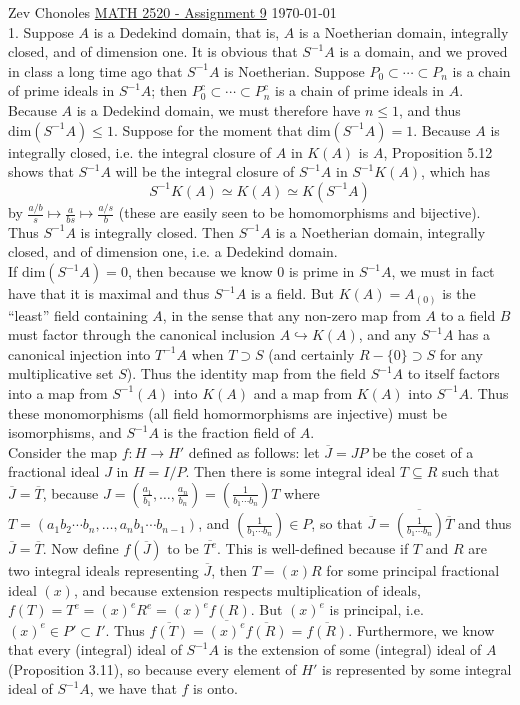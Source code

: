 \documentclass[11pt]{article}
\begin{document}
Zev Chonoles \hfill 
\underline{MATH 2520 - Assignment 9} \hfill \today\\

\num{1.} Suppose $A$ is a Dedekind domain, that is, $A$ is a Noetherian
domain, integrally closed, and of dimension one. It is obvious that
$S^{-1}A$ is a domain, and we proved in class a long time ago that $S^{-1}A$
is Noetherian. Suppose $P_0\subset\cdots\subset P_n$ is a chain of prime
ideals in $S^{-1}A$; then $P_0^c\subset\cdots\subset P_n^c$ is a chain of
prime ideals in $A$. Because $A$ is a Dedekind domain, we must therefore have
$n\leq 1$, and thus $\text{dim}(S^{-1}A)\leq 1$. Suppose for the moment that
$\text{dim}(S^{-1}A)=1$. Because $A$ is integrally closed, i.e. the integral
closure of $A$ in $K(A)$ is $A$, Proposition 5.12 shows that $S^{-1}A$
will be the integral closure of $S^{-1}A$ in $S^{-1}K(A)$, which has
\[S^{-1}K(A)\simeq K(A)\simeq K(S^{-1}A)\]
by $\frac{a/b}{s}\mapsto\frac{a}{bs}\mapsto\frac{a/s}{b}$ (these are easily
seen to be homomorphisms and bijective). Thus $S^{-1}A$ is integrally
closed. Then $S^{-1}A$ is a Noetherian domain, integrally closed, and of
dimension one, i.e. a Dedekind domain.\\

If $\text{dim}(S^{-1}A)=0$, then because we know 0 is prime in $S^{-1}A$,
we must in fact have that it is maximal and thus $S^{-1}A$ is a field. But
$K(A)=A_{(0)}$ is the ``least'' field containing $A$, in the sense that
any non-zero map from $A$ to a field $B$ must factor through the canonical
inclusion $A\hookrightarrow K(A)$, and any $S^{-1}A$ has a canonical injection
into $T^{-1}A$ when $T\supset S$ (and certainly $R-\{0\}\supset S$ for any
multiplicative set $S$). Thus the identity map from the field $S^{-1}A$
to itself factors into a map from $S^{-1}(A)$ into $K(A)$ and a map from
$K(A)$ into $S^{-1}A$. Thus these monomorphisms (all field homormorphisms
are injective) must be isomorphisms, and $S^{-1}A$ is the fraction field of
$A$. \\

Consider the map $f:H\rightarrow H'$ defined as follows: let $\overline{J}=JP$
be the coset of a fractional ideal $J$ in $H=I/P$. Then there is some
integral ideal $T\subseteq R$ such that $\overline{J}=\overline{T}$, because
$J=(\frac{a_1}{b_1},\ldots,\frac{a_n}{b_n})=(\frac{1}{b_1\cdots b_n})T$ where
$T=(a_1b_2\cdots b_n,\ldots,a_nb_1\cdots b_{n-1})$, and $(\frac{1}{b_1\cdots
b_n})\in P$, so that $\overline{J}=\overline{(\frac{1}{b_1\cdots
b_n})}\overline{T}$ and thus $\overline{J}=\overline{T}$. Now define
$f(\overline{J})$ to be $\overline{T^e}$. This is well-defined because
if $T$ and $R$ are two integral ideals representing $\overline{J}$, then
$T=(x)R$ for some principal fractional ideal $(x)$, and because extension
respects multiplication of ideals, $f(T)=T^e=(x)^eR^e=(x)^ef(R)$. But
$(x)^e$ is principal, i.e. $(x)^e\in P'\subset I'$. Thus
$\overline{f(T)}=\overline{(x)^e}\overline{f(R)}=\overline{f(R)}$. Furthermore,
we know that every (integral) ideal of $S^{-1}A$ is the extension of some
(integral) ideal of $A$ (Proposition 3.11), so because every element of $H'$ is
represented by some integral ideal of $S^{-1}A$, we have that $f$ is onto.\\
\end{document}
